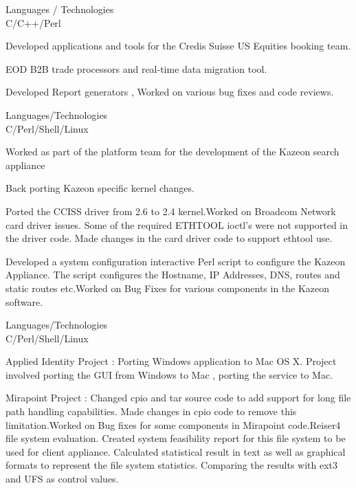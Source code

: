 \documentclass[a4,10pt]{cv4tw}
\begin{document}
{Languages / Technologies \\ C/C++/Perl}
	{ 
	\begin{missions}
		\item Developed applications and tools for the Credis Suisse US Equities booking team.
		\item EOD B2B trade processors and real-time data migration tool.
		\item Developed Report generators , Worked on various bug fixes and code reviews.		
	\end{missions}
}

{Languages/Technologies \\ C/Perl/Shell/Linux}
	{ 
	\begin{missions}		
		\item Worked as part of the platform team for the development of the Kazeon search appliance
		\item Back porting Kazeon specific kernel changes.
		\item Ported the CCISS driver from 2.6 to 2.4 kernel.Worked on Broadcom Network card driver issues. Some of the required ETHTOOL ioctl's were not supported in the driver code. Made changes in the card driver code to support ethtool use.		
		\item Developed a  system configuration interactive Perl script to configure the Kazeon Appliance. The script configures the Hostname, IP Addresses, DNS, routes and static routes etc.Worked on Bug Fixes for various components in the Kazeon software.	
	\end{missions}
}

{Languages/Technologies \\ C/Perl/Shell/Linux}
	{ 
	\begin{missions}				
		\item Applied Identity Project : Porting Windows application to Mac OS X. Project involved porting the GUI from Windows to Mac , porting the service to Mac.
		\item Mirapoint Project : Changed cpio and tar source code to add support for long file path handling capabilities. Made changes in cpio code to remove this limitation.Worked on Bug fixes for some components in Mirapoint code.Reiser4 file system evaluation. Created system feasibility report for this file system to be used for client appliance. Calculated statistical result in text as well as graphical formats to represent the file system statistics. Comparing the results with ext3 and UFS as control values.
	\end{missions}
}
\end{document}
